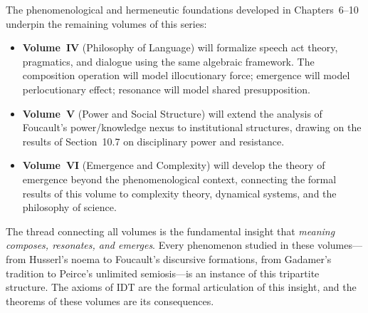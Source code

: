 \begin{remark}
\label{rem:looking-forward}
The phenomenological and hermeneutic foundations developed in Chapters~6--10
underpin the remaining volumes of this series:

\begin{itemize}
\item \textbf{Volume~IV} (Philosophy of Language) will formalize speech act
theory, pragmatics, and dialogue using the same algebraic framework.
The composition operation will model illocutionary force; emergence will
model perlocutionary effect; resonance will model shared presupposition.

\item \textbf{Volume~V} (Power and Social Structure) will extend the analysis
of Foucault's power/knowledge nexus to institutional structures, drawing on
the results of Section~10.7 on disciplinary power and resistance.

\item \textbf{Volume~VI} (Emergence and Complexity) will develop the theory
of emergence beyond the phenomenological context, connecting the formal
results of this volume to complexity theory, dynamical systems, and the
philosophy of science.
\end{itemize}

The thread connecting all volumes is the fundamental insight that
\emph{meaning composes, resonates, and emerges}.  Every phenomenon studied
in these volumes---from Husserl's noema to Foucault's discursive formations,
from Gadamer's tradition to Peirce's unlimited semiosis---is an instance
of this tripartite structure.  The axioms of IDT are the formal articulation
of this insight, and the theorems of these volumes are its consequences.
\end{remark}

